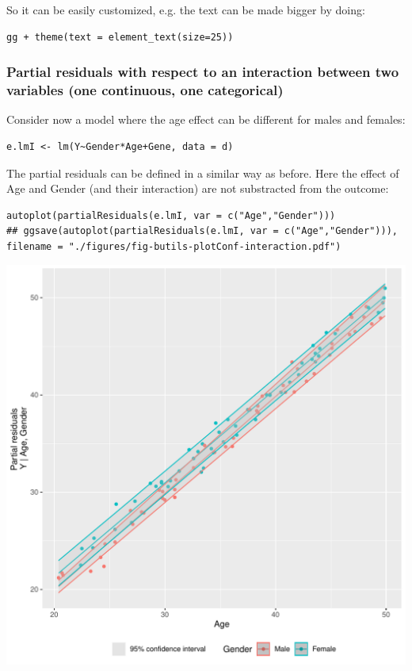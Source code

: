 \documentclass{article}
\begin{document}
So it can be easily customized, e.g. the text can be made bigger by
doing:
\lstset{language=r,label= ,caption= ,captionpos=b,numbers=none}
\begin{lstlisting}
gg + theme(text = element_text(size=25))
\end{lstlisting}

\subsubsection{Partial residuals with respect to an interaction between two variables (one continuous, one categorical)}
\label{sec:org1201257}

Consider now a model where the age effect can be different for males
and females:
\lstset{language=r,label= ,caption= ,captionpos=b,numbers=none}
\begin{lstlisting}
e.lmI <- lm(Y~Gender*Age+Gene, data = d)
\end{lstlisting}

The partial residuals can be defined in a similar way as before. Here
the effect of Age and Gender (and their interaction) are not
substracted from the outcome:
\lstset{language=r,label= ,caption= ,captionpos=b,numbers=none}
\begin{lstlisting}
autoplot(partialResiduals(e.lmI, var = c("Age","Gender")))
## ggsave(autoplot(partialResiduals(e.lmI, var = c("Age","Gender"))), filename = "./figures/fig-butils-plotConf-interaction.pdf")
\end{lstlisting}

\begin{center}
\includegraphics[width=1\textwidth]{./figures/fig-butils-plotConf-interaction.pdf}
\end{center}
\end{document}
